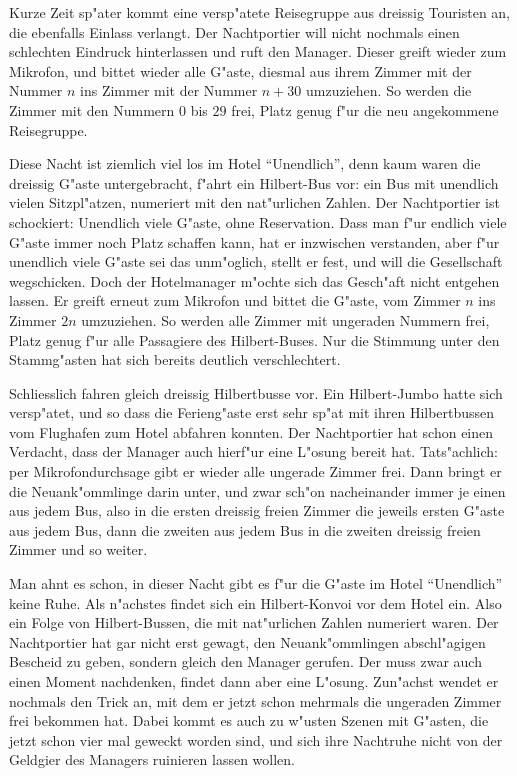 Kurze Zeit sp"ater kommt eine versp"atete Reisegruppe aus dreissig
Touristen an, die ebenfalls
Einlass verlangt. Der Nachtportier will nicht nochmals einen schlechten
Eindruck hinterlassen und ruft den Manager. Dieser greift
wieder zum Mikrofon, und bittet wieder alle G"aste, diesmal aus
ihrem Zimmer mit der Nummer $n$ ins Zimmer mit der Nummer $n+30$
umzuziehen. So werden die Zimmer mit den Nummern $0$ bis $29$ frei,
Platz genug f"ur die neu angekommene Reisegruppe.

Diese Nacht ist ziemlich viel los im Hotel ``Unendlich'', denn
kaum waren die dreissig G"aste untergebracht, f"ahrt ein Hilbert-Bus
vor: ein Bus mit unendlich vielen Sitzpl"atzen, numeriert mit den
nat"urlichen Zahlen. Der Nachtportier ist schockiert: Unendlich
viele G"aste, ohne Reservation. Dass man f"ur endlich viele G"aste
immer noch Platz schaffen kann, hat er inzwischen verstanden, aber
f"ur unendlich viele G"aste sei das unm"oglich, stellt er fest, und
will die Gesellschaft wegschicken. Doch der Hotelmanager m"ochte
sich das Gesch"aft nicht entgehen lassen. Er greift erneut zum
Mikrofon und bittet die G"aste, vom Zimmer $n$ ins Zimmer $2n$ umzuziehen.
So werden alle Zimmer mit ungeraden Nummern frei, Platz genug f"ur alle
Passagiere des Hilbert-Buses. Nur die Stimmung unter den Stammg"asten
hat sich bereits deutlich verschlechtert.

Schliesslich fahren gleich dreissig Hilbertbusse vor. Ein Hilbert-Jumbo
hatte sich versp"atet, und so dass die Ferieng"aste erst sehr sp"at
mit ihren Hilbertbussen vom Flughafen zum Hotel abfahren konnten.
Der Nachtportier hat schon einen Verdacht, dass der Manager auch
hierf"ur eine L"osung bereit hat. Tats"achlich: per Mikrofondurchsage
gibt er wieder alle ungerade Zimmer frei. Dann bringt er die Neuank"ommlinge
darin unter, und zwar sch"on nacheinander immer je einen aus jedem Bus,
also in die ersten dreissig freien Zimmer die jeweils ersten G"aste
aus jedem Bus, dann die zweiten aus jedem Bus in die zweiten dreissig
freien Zimmer und so weiter.

Man ahnt es schon, in dieser Nacht gibt es f"ur die G"aste im Hotel
``Unendlich'' keine Ruhe. Als n"achstes findet sich ein Hilbert-Konvoi
vor dem Hotel ein. Also ein Folge von Hilbert-Bussen, die mit nat"urlichen
Zahlen numeriert waren. Der Nachtportier hat gar nicht erst gewagt,
den Neuank"ommlingen abschl"agigen Bescheid zu geben, sondern gleich
den Manager gerufen. Der muss zwar auch einen Moment nachdenken, findet
dann aber eine L"osung. Zun"achst wendet er nochmals den Trick an,
mit dem er jetzt schon mehrmals die ungeraden Zimmer frei bekommen hat.
Dabei kommt es auch zu w"usten Szenen mit G"asten, die jetzt schon vier mal
geweckt worden sind, und sich ihre Nachtruhe nicht von der Geldgier des
Managers ruinieren lassen wollen.

